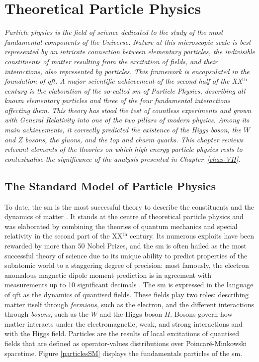 \chapter{\color{oxfordblue} Theoretical Particle Physics}\label{chap-theory}
\ChapFrame

\textit{Particle physics is the field of science dedicated to the study of the most fundamental components of the Universe. Nature at this microscopic scale is best represented by an intricate connection between elementary particles, the indivisible constituents of matter resulting from the excitation of fields, and their interactions, also represented by particles. This framework is encapsulated in the foundation of \gls{qft}. A major scientific achievement of the second half of the XX$^{\text{th}}$ century is the elaboration of the so-called \gls{sm} of Particle Physics, describing all known elementary particles and three of the four fundamental interactions affecting them. This theory has stood the test of countless experiments and grown with General Relativity into one of the two pillars of modern physics. Among its main achievements, it correctly predicted the existence of the Higgs boson, the $W$ and $Z$ bosons, the gluons, and the top and charm quarks. This chapter reviews relevant elements of the theories on which high energy particle physics rests to contextualise the significance of the analysis presented in Chapter~\ref{chap-VH}.}

\section{The Standard Model of Particle Physics}\label{Section:SM}
To date, the \gls{sm} is the most successful theory to describe the constituents and the dynamics of matter \cite{SMphysics}. It stands at the centre of theoretical particle physics and was elaborated by combining the theories of quantum mechanics and special relativity in the second part of the XX$^{\text{th}}$ century. Its numerous exploits have been rewarded by more than 50 Nobel Prizes, and the \gls{sm} is often hailed as the most successful theory of science due to its unique ability to predict properties of the subatomic world to a staggering degree of precision: most famously, the electron anomalous magnetic dipole moment prediction is in agreement with measurements up to 10 significant decimals \cite{PhysRevA.83.052122}. The \gls{sm} is expressed in the language of \gls{qft} as the dynamics of quantised fields. These fields play two roles: describing matter itself through \textit{fermions}, such as the electron, and the different interactions through \textit{bosons}, such as the $W$ and the Higgs boson $H$. Bosons govern how matter interacts under the electromagnetic, weak, and strong interactions and with the Higgs field. Particles are the results of local excitations of quantised fields that are defined as operator-values distributions over Poincaré-Minkowski spacetime. Figure \ref{particlesSM} displays the fundamentals particles of the \gls{sm}. \\

